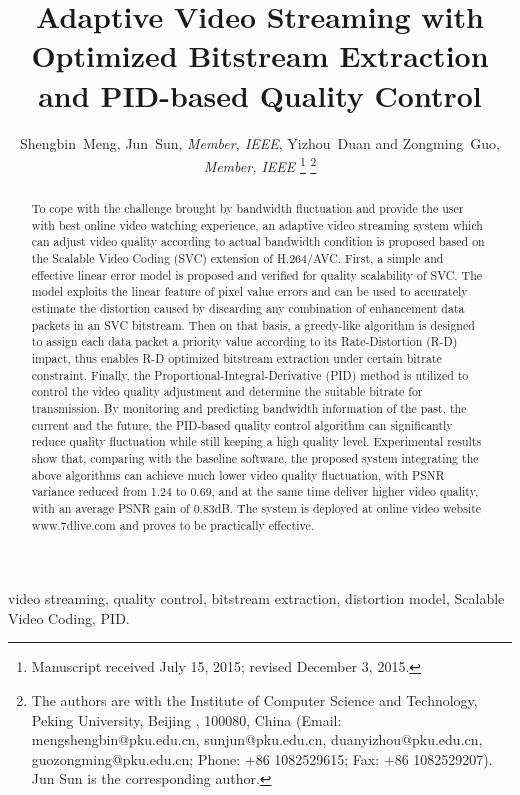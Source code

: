 \documentclass[journal]{IEEEtran}
\title{Adaptive Video Streaming with Optimized Bitstream Extraction and PID-based Quality Control}
\author{Shengbin~Meng, Jun~Sun, {\em Member, IEEE}, Yizhou~Duan and Zongming~Guo, {\em Member, IEEE} %
\thanks{Manuscript received July 15, 2015; revised December 3, 2015.}
\thanks{The authors are with the Institute of Computer Science and Technology, Peking University, Beijing%
, 100080, China (Email: mengshengbin@pku.edu.cn, sunjun@pku.edu.cn, duanyizhou@pku.edu.cn, guozongming@pku.edu.cn; Phone: +86 1082529615; Fax: +86 1082529207). Jun Sun is the corresponding author.}}
\begin{document}



\maketitle

\begin{abstract}
To cope with the challenge brought by bandwidth fluctuation and provide the user with best online video watching experience, an adaptive video streaming system which can adjust video quality according to actual bandwidth condition is proposed based on the Scalable Video Coding (SVC) extension of H.264/AVC. First, a simple and effective linear error model is proposed and verified for quality scalability of SVC. The model exploits the linear feature of pixel value errors and can be used to accurately estimate the distortion caused by discarding any combination of enhancement data packets in an SVC bitstream. Then on that basis, a greedy-like algorithm is designed to assign each data packet a priority value according to its Rate-Distortion (R-D) impact, thus enables R-D optimized bitstream extraction under certain bitrate constraint. Finally, the Proportional-Integral-Derivative (PID) method is utilized to control the video quality adjustment and determine the suitable bitrate for transmission. By monitoring and predicting bandwidth information of the past, the current and the future, the PID-based quality control algorithm can significantly reduce quality fluctuation while still keeping a high quality level. Experimental results show that, comparing with the baseline software, the proposed system integrating the above algorithms can achieve much lower video quality fluctuation, with PSNR variance reduced from 1.24 to 0.69, and at the same time deliver higher video quality, with an average PSNR gain of 0.83dB. The system is deployed at online video website www.7dlive.com and proves to be practically effective.
\end{abstract}

\begin{IEEEkeywords}
video streaming, quality control, bitstream extraction, distortion model, Scalable Video Coding, PID.
\end{IEEEkeywords}
\end{document}
